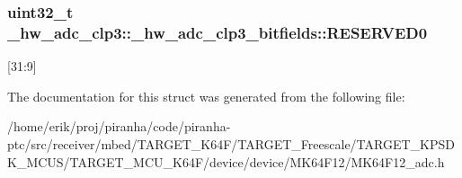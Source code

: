 \subsubsection[{\texorpdfstring{R\+E\+S\+E\+R\+V\+E\+D0}{RESERVED0}}]{\setlength{\rightskip}{0pt plus 5cm}uint32\+\_\+t \+\_\+hw\+\_\+adc\+\_\+clp3\+::\+\_\+hw\+\_\+adc\+\_\+clp3\+\_\+bitfields\+::\+R\+E\+S\+E\+R\+V\+E\+D0}\hypertarget{struct__hw__adc__clp3_1_1__hw__adc__clp3__bitfields_ac7fe43ce1be4a00dd53e73e0aae3bc1a}{}\label{struct__hw__adc__clp3_1_1__hw__adc__clp3__bitfields_ac7fe43ce1be4a00dd53e73e0aae3bc1a}
\mbox{[}31\+:9\mbox{]} 

The documentation for this struct was generated from the following file\+:\begin{DoxyCompactItemize}
\item 
/home/erik/proj/piranha/code/piranha-\/ptc/src/receiver/mbed/\+T\+A\+R\+G\+E\+T\+\_\+\+K64\+F/\+T\+A\+R\+G\+E\+T\+\_\+\+Freescale/\+T\+A\+R\+G\+E\+T\+\_\+\+K\+P\+S\+D\+K\+\_\+\+M\+C\+U\+S/\+T\+A\+R\+G\+E\+T\+\_\+\+M\+C\+U\+\_\+\+K64\+F/device/device/\+M\+K64\+F12/M\+K64\+F12\+\_\+adc.\+h\end{DoxyCompactItemize}
